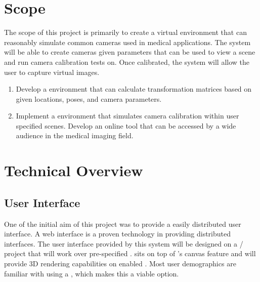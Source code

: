 \documentclass[11pt]{report}
\begin{document}
\section{Scope}
The scope of this project is primarily to create a virtual environment that can reasonably simulate common cameras used in medical applications. The system will be able to create cameras given parameters that can be used to view a scene and run camera calibration tests on. Once calibrated, the system will allow the user to capture virtual images. 
 
\begin{enumerate}
\item Develop a  environment that can calculate transformation matrices based on given locations, poses, and camera parameters.  
\item Implement a  environment that simulates camera calibration within user specified scenes. Develop an online tool that can be accessed by a wide audience in the medical imaging field.
\end{enumerate}

\section{Technical Overview}

\subsection{User Interface}




One of the initial aim of this project was to provide a easily distributed user interface. A web interface is a proven technology in providing distributed interfaces. The user interface provided by this system will be designed on a / project that will work over pre-specified .  sits on top of 's canvas feature and will provide 3D rendering capabilities on enabled . Most user demographics are familiar with using a , which makes this a viable option. 
\end{document}
